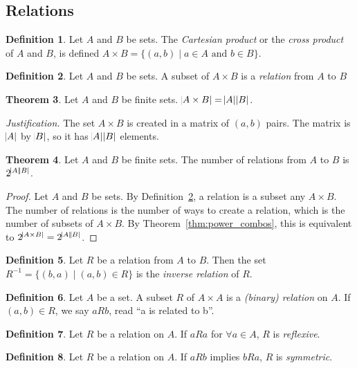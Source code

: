 \documentclass[11pt]{article}
\theoremstyle{definition}
\newtheorem{theorem}{Theorem}[section]
\newtheorem{definition}[theorem]{Definition}
\newenvironment{just}{\textit{Justification.}}{}
\begin{document}
\subsection{Relations}
\begin{definition}
    Let $A$ and $B$ be sets. The \emph{Cartesian product} or the \emph{cross product} of $A$ and $B$, is defined $A \times B = \{(a,b) \mid a\in A \text{ and } b\in B \}$.
\end{definition}
\begin{definition}
    Let $A$ and $B$ be sets. A subset of $A \times B$ is a \emph{relation} from $A$ to $B$
    \label{def:relation}
\end{definition}
\begin{theorem}
    Let $A$ and $B$ be finite sets. $\abs{A\times B} = \abs{A}\abs{B}$.
\end{theorem}
\begin{just}
    The set $A \times B$ is created in a matrix of $(a,b)$ pairs. The matrix is $\abs{A}$ by $\abs{B}$, so it has $\abs{A}\abs{B}$ elements.
\end{just}
\begin{theorem}
    Let $A$ and $B$ be finite sets. The number of relations from $A$ to $B$ is $2^{\abs{A}\abs{B}}$.
\end{theorem}
\begin{proof}
    Let $A$ and $B$ be sets. By Definition~\ref{def:relation}, a relation is a subset any $A \times B$. The number of relations is the number of ways to create a relation, which is the number of subsets of $A \times B$. By Theorem~\ref{thm:power_combos}, this is equivalent to $2^{\abs{A \times B}}=2^{\abs{A}\abs{B}}$.
\end{proof}
\begin{definition}
    Let $R$ be a relation from $A$ to $B$. Then the set $R^{-1}=\{(b,a) \mid (a,b)\in R \}$ is the \emph{inverse relation} of $R$.
\end{definition}
\begin{definition}
    Let $A$ be a set. A subset $R$ of $A \times A$ is a \emph{(binary) relation} on $A$. If $(a,b)\in R$, we say $aRb$, read ``a is related to b''.
\end{definition}
\begin{definition}
    Let $R$ be a relation on $A$. If $aRa$ for $\forall a \in A$, $R$ is \emph{reflexive}.
\end{definition}
\begin{definition}
    Let $R$ be a relation on $A$. If $aRb$ implies $bRa$, $R$ is \emph{symmetric}.
\end{definition}
\end{document}
